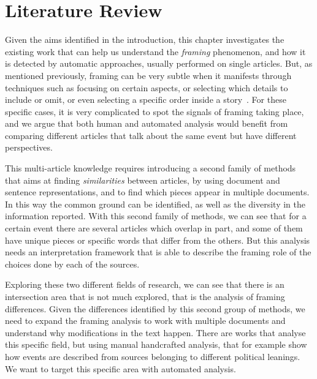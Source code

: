 \chapter{Literature Review}
\label{chap:literature_review}



Given the aims identified in the introduction, this chapter investigates the existing work that can help us understand the \emph{framing} phenomenon, and how it is detected by automatic approaches, usually performed on single articles.
But, as mentioned previously, %
framing can be very subtle when it manifests through techniques such as focusing on certain aspects, or selecting which details to include or omit, or even selecting a specific order inside a story~\cite{morstatter2018identifying}.
For these specific cases, it is very complicated to spot the signals of framing taking place, and we argue that both human and automated analysis would benefit from comparing different articles that talk about the same event but have different perspectives. %

This multi-article knowledge requires introducing a second family of methods that aims at finding \emph{similarities} between articles, by using document and sentence representations, and to find which pieces appear in multiple documents. In this way the common ground can be identified, as well as the diversity in the information reported.
With this second family of methods, we can see that for a certain event there are several articles which overlap in part, and some of them have unique pieces or specific words that differ from the others. But this analysis needs an interpretation framework that is able to describe the framing role of the choices done by each of the sources.

Exploring these two different fields of research, we can see that there is an intersection area that is not much explored, that is the analysis of framing differences. Given the differences identified by this second group of methods, we need to expand the framing analysis to work with multiple documents and understand why modifications in the text happen.
There are works that analyse this specific field, but using manual handcrafted analysis, that for example show how events are described from sources belonging to different political leanings. We want to target this specific area with automated analysis.

